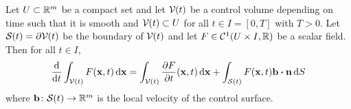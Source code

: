 \begin{theorem}
	Let $U \subset \mathbb{R}^m$ be a compact set and let $\mathcal{V}_{}(t)$ be a control volume depending on time such that it is smooth and $\mathcal{V}_{}(t) \subset U$ for all $t \in I = [0, T]$ with $T > 0$. Let $\mathcal{S}_{}(t) = \partial \mathcal{V}_{}(t)$ be the boundary of $\mathcal{V}_{}(t)$ and let $F \in \mathcal{C}^1(U \times I, \mathbb{R})$ be a scalar field. Then for all $t \in I$,
	\begin{equation} \label{eq:reynolds_transport_theorem}
		\frac{\dd}{\dd{t}} \int_{\cv{}(t)} F(\vb{x}, t) \dd{\vb{x}} = 
		\int_{\cv{}(t)} \frac{\partial F}{\partial t} (\vb{x}, t) \dd{\vb{x}} + 
		\int_{\cs{}(t)} F(\vb{x}, t) \vb{b} \vdot \vb{n} \dd{S}
	\end{equation}
	where $\vb{b} \colon \mathcal{S}_{}(t) \rightarrow \mathbb{R}^m$ is the local velocity of the control surface.
\end{theorem}
